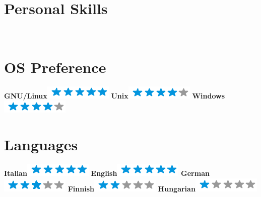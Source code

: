 \documentclass[]{friggeri-cv}
\begin{document}
\begin{aside}
  \section{Personal Skills}
    ~
    \section{OS Preference}
    \textbf{GNU/Linux}\includegraphics[scale=0.40]{img/5stars.png}
    \textbf{Unix}\includegraphics[scale=0.40]{img/4stars.png}
    \textbf{Windows}\includegraphics[scale=0.40]{img/4stars.png}
    ~
  \section{Languages}
    \textbf{Italian}\includegraphics[scale=0.40]{img/5stars.png}
    \textbf{English}\includegraphics[scale=0.40]{img/5stars.png}
    \textbf{German}\includegraphics[scale=0.40]{img/3stars.png}
    \textbf{Finnish}\includegraphics[scale=0.40]{img/2stars.png}
    \textbf{Hungarian}\includegraphics[scale=0.40]{img/1stars.png}
    ~
\end{aside}
\end{document}
